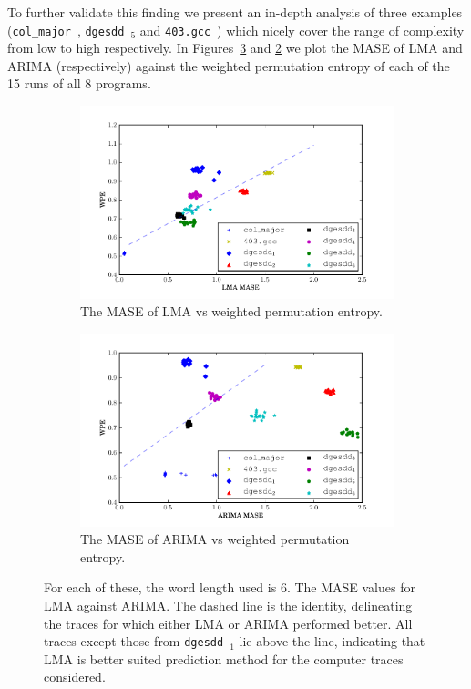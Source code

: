 \documentclass{article}
\newcommand{\gcc}{{\tt 403.gcc}~}
\newcommand{\svd}{{\tt dgesdd}~}
\newcommand{\col}{{\tt col\_major}~}
\begin{document}
To further validate this finding we present an in-depth analysis of three examples (\col, \svd$_5$ and \gcc ) which nicely cover the range of complexity from low to high respectively. In Figures~\ref{fig:lma_vs_arima} and \ref{fig:arima_pred_vs_ent} we plot the MASE of LMA and ARIMA (respectively) against the weighted permutation entropy of each of the 15 runs of all 8 programs.


\begin{figure}[htbp]
  \centering
       
  \begin{subfigure}{0.5\textwidth}
    \includegraphics[width=\textwidth]{figs/LMA_prediction_vs_entropy}
    \caption{The MASE of LMA vs weighted permutation entropy. }
    \label{fig:lma_pred_vs_ent}
  \end{subfigure}%
  \begin{subfigure}{0.5\textwidth}
    \includegraphics[width=\textwidth]{figs/ARIMA_prediction_vs_entropy}
    \caption{The MASE of ARIMA vs weighted permutation entropy. }
    \label{fig:arima_pred_vs_ent}
  \end{subfigure}
\caption{
For each of these, the word length used is $6$. The MASE values for LMA against ARIMA. The dashed line is the identity, delineating the traces for which either LMA or ARIMA performed better. All traces except those from \svd$_1$ lie above the line, indicating that LMA is better suited prediction method for the computer traces considered.}\label{fig:lma_vs_arima}  
\end{figure} 
\end{document}
